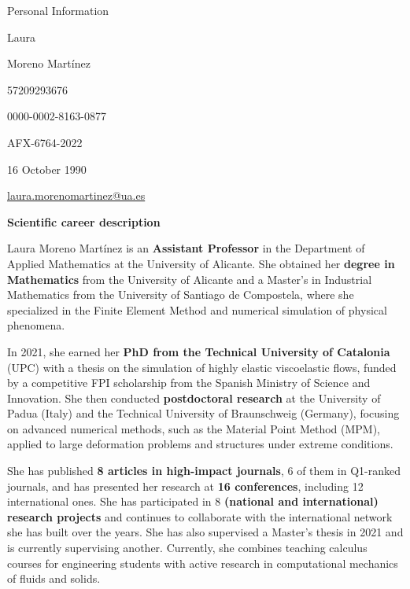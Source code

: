 \documentclass[letterpaper,english]{article}
\begin{document}
\begin{cv}{}

\vspace{-2cm}
 \begin{cvlist}{Personal Information}
    		\setlength{\itemsep}{-6pt}
		\item[\footnotesize{First name}] Laura
		\item[\footnotesize{Family name}] Moreno Martínez
    	\item [\footnotesize{Scopus}] 57209293676
    	\item [\footnotesize{ORCID}] 0000-0002-8163-0877
    	\item [\footnotesize{Research ID}] AFX-6764-2022
    	\item[\footnotesize{Data of birth}] 16 October 1990
    	\item[\footnotesize{Email address}] \href{mailto:laura.morenomartinez@ua.es}{laura.morenomartinez@ua.es}
\end{cvlist}


\vspace{0.4cm}
\noindent\large{\textbf{Scientific career description}}
\vspace{0.25cm}
\normalsize

Laura Moreno Martínez is an \textbf{Assistant Professor} in the Department of Applied Mathematics at the University of Alicante. She obtained her \textbf{degree in Mathematics} from the University of Alicante and a Master's in Industrial Mathematics from the University of Santiago de Compostela, where she specialized in the Finite Element Method and numerical simulation of physical phenomena.

In 2021, she earned her \textbf{PhD from the Technical University of Catalonia} (UPC) with a thesis on the simulation of highly elastic viscoelastic flows, funded by a competitive FPI scholarship from the Spanish Ministry of Science and Innovation. She then conducted \textbf{postdoctoral research} at the University of Padua (Italy) and the Technical University of Braunschweig (Germany), focusing on advanced numerical methods, such as the Material Point Method (MPM), applied to large deformation problems and structures under extreme conditions.

She has published \textbf{8 articles in high-impact journals}, 6 of them in Q1-ranked journals, and has presented her research at \textbf{16 conferences}, including 12 international ones. She has participated in 8\textbf{ (national and international) research projects} and continues to collaborate with the international network she has built over the years. She has also supervised a Master's thesis in 2021 and is currently supervising another. 
Currently, she combines teaching calculus courses for engineering students with active research in computational mechanics of fluids and solids.



\end{cv}
\end{document}
